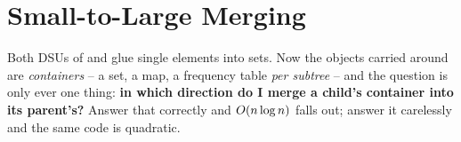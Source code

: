 \section{Small-to-Large Merging}\label{sec:c28-s2l}

\begin{previouslybox}
Both DSUs of  and  glue single elements
into sets.  Now the objects carried around are \emph{containers} -- a set, a
map, a frequency table \emph{per subtree} -- and the question is only ever one
thing: \textbf{in which direction do I merge a child's container into its
parent's?}  Answer that correctly and \(O(n\log n)\) falls out; answer it
carelessly and the same code is quadratic.
\end{previouslybox}

